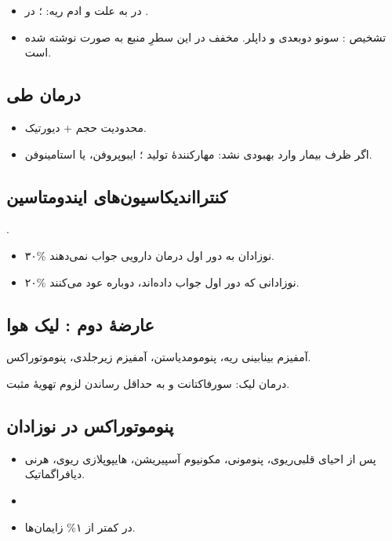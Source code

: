 \documentclass[12pt,a4paper]{article}
\begin{document}
\begin{itemize}
\item در  به علت  و ادم ریه: ؛  در .
\item تشخیص : سونو دوبعدی و داپلر. مخفف در این سطرِ منبع به صورت  نوشته شده است.
\end{itemize}
\subsection*{درمان  طی }
\begin{itemize}
\item محدودیت حجم + دیورتیک.
\item اگر ظرف  بیمار وارد بهبودی نشد: مهارکنندهٔ تولید ؛ ایبوپروفن،  یا استامینوفن.
\end{itemize}
\subsection*{کنترااندیکاسیون‌های ایندومتاسین}
.
\begin{itemize}
\item ۳۰\% نوزادان  به دور اول درمان دارویی جواب نمی‌دهند.
\item ۲۰\% نوزادانی که دور اول جواب داده‌اند، دوباره عود می‌کنند.
\end{itemize}
\subsection*{عارضهٔ دوم : لیک هوا}
آمفیزم بینابینی ریه، پنومومدیاستن، آمفیزم زیرجلدی، پنوموتوراکس.
\par درمان لیک: سورفاکتانت و به حداقل رساندن لزوم تهویهٔ مثبت.
\subsection*{پنوموتوراکس در نوزادان}
\begin{itemize}
\item پس از احیای قلبی‌ریوی، پنومونی، مکونیوم آسپیریشن، هایپوپلازی ریوی، هرنی دیافراگماتیک.
\item {}
\item در کمتر از ۱\% زایمان‌ها.
\end{itemize}

\end{document}

